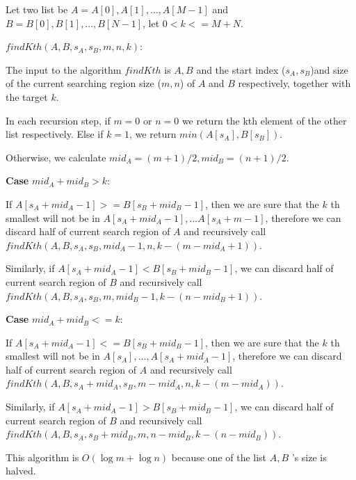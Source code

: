 \documentclass[twoside]{homework}
\begin{document}
	Let two list be $A = A[0], A[1], ..., A[M-1]$ and $ B = B[0], B[1], ..., B[N-1]$, let $0 < k <= M + N$.

	$findKth(A, B, s_A, s_B, m, n, k)$:

	The input to the algorithm $findKth$ is $A, B$ and the start index ($s_A, s_B$)and size of the current searching region size ($m, n$) of $A $ and $B$ respectively, together with the target $k$.

	In each recursion step, if $m = 0$ or $n = 0$ we return the kth element of the other list respectively. Else if $k = 1$, we return $min(A[s_A], B[s_B])$.

	Otherwise, we calculate $mid_A = (m+1)/2, mid_B = (n+1)/2$.

	\textbf{Case} $mid_A + mid_B > k$:

	If $A[s_A + mid_A -1] >= B[s_B + mid_B -1]$, then we are sure that the $k$ th smallest will not be in $A[s_A + mid_A -1],... A[s_A + m -1]$, therefore we can discard half of current search region of $A$ and recursively call $findKth(A, B, s_A, s_B, mid_A -1, n, k - (m - mid_A + 1))$.

	Similarly, if $A[s_A + mid_A -1] < B[s_B + mid_B -1]$, we can discard half of current search region of $B$ and recursively call $findKth(A, B, s_A, s_B, m, mid_B - 1, k - (n - mid_B + 1))$.

	\textbf{Case} $mid_A + mid_B <= k$:

	If $A[s_A + mid_A -1] <= B[s_B + mid_B -1]$, then we are sure that the $k$ th smallest will not be in $A[s_A], ..., A[s_A + mid_A -1]$, therefore we can discard half of current search region of $A$ and recursively call $findKth(A, B, s_A + mid_A, s_B, m - mid_A, n, k - (m - mid_A))$.

	Similarly, if $A[s_A + mid_A -1] > B[s_B + mid_B -1]$, we can discard half of current search region of $B$ and recursively call $findKth(A, B, s_A, s_B + mid_B, m, n - mid_B, k - (n - mid_B))$.

	This algorithm is $O(\log m + \log n)$ because one of the list $A, B$ 's size is halved.


\newcommand{\vecm}{\bm{m}}
\newcommand{\vecv}{\bm{v}}
\end{document}
